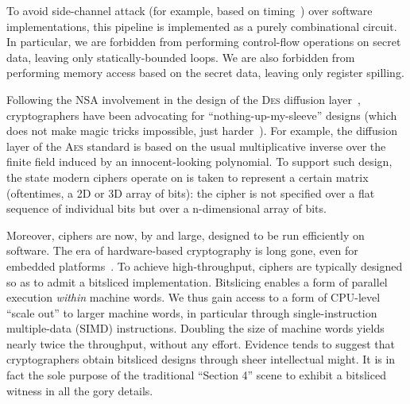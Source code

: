 \documentclass[draft,english]{jflart}
\newcommand{\AES}{\textsc{Aes}}
\newcommand{\DES}{\textsc{Des}}
\begin{document}

To avoid side-channel attack (for example, based on
timing~\citep{bernstein:timing-attack-AES}) over software
implementations, this pipeline is implemented as a purely
combinational circuit. In particular, we are forbidden from performing
control-flow operations on secret data, leaving only
statically-bounded loops. We are also forbidden from performing memory
access based on the secret data, leaving only register spilling.


Following the NSA involvement in the design of the \DES{} diffusion
layer~\citep{johnson:cold-war-crypto}, cryptographers have been
advocating for ``nothing-up-my-sleeve'' designs (which does not make
magic tricks impossible, just
harder~\citep{bernstein:something-up-my-sleeves}). For example, the
diffusion layer of the \AES{} standard is based on the usual
multiplicative inverse over the finite field induced by an
innocent-looking polynomial. To support such design, the state modern
ciphers operate on is taken to represent a certain matrix
(oftentimes, a 2D or 3D array of bits): the cipher is not specified
over a flat sequence of individual bits but over a n-dimensional array
of bits.


Moreover, ciphers are now, by and large, designed to be run
efficiently on software. The era of hardware-based cryptography is
long gone, even for embedded
platforms~\citep{buchanan:nist-lightweight-crypto}. To achieve
high-throughput, ciphers are typically designed so as to admit a
bitsliced implementation. Bitslicing enables a form of parallel
execution \emph{within} machine words. We thus gain access to a form
of CPU-level ``scale out'' to larger machine words, in particular
through single-instruction multiple-data (SIMD) instructions. Doubling
the size of machine words yields nearly twice the throughput, without
any effort. Evidence tends to suggest that cryptographers obtain
bitsliced designs through sheer intellectual might. It is in fact the
sole purpose of the traditional ``Section 4'' scene to exhibit a
bitsliced witness in all the gory details.
\end{document}
